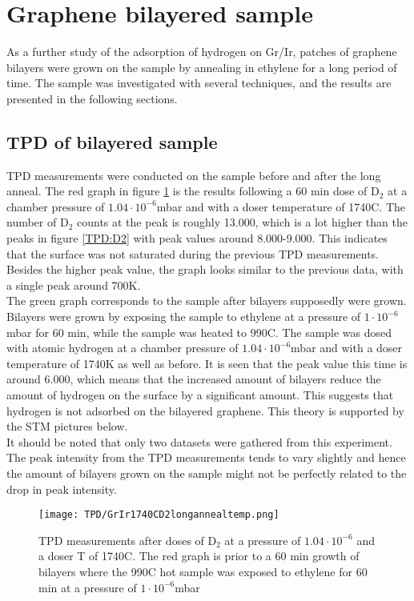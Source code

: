 \section{Graphene bilayered sample}

As a further study of the adsorption of hydrogen on Gr/Ir, patches of graphene bilayers were grown on the sample by annealing in ethylene for a long period of time. The sample was investigated with several techniques, and the results are presented in the following sections.

\subsection{TPD of bilayered sample}
TPD measurements were conducted on the sample before and after the long anneal. The red graph in figure \ref{TPD:bilayer} is the results following a 60 min dose of D$_2$ at a chamber pressure of $1.04\cdot10^{-6}$mbar and with a doser temperature of 1740\degree C. The number of D$_2$ counts at the peak is roughly 13.000, which is a lot higher than the peaks in figure \ref{TPD:D2} with peak values around 8.000-9.000. This indicates that the surface was not saturated during the previous TPD measurements. Besides the higher peak value, the graph looks similar to the previous data, with a single peak around 700K.\\
The green graph corresponds to the sample after bilayers supposedly were grown. Bilayers were grown by exposing the sample to ethylene at a pressure of $1\cdot 10^{-6}$mbar for 60 min, while the sample was heated to 990\degree C. The sample was dosed with atomic hydrogen at a chamber pressure of $1.04\cdot 10^{-6}$mbar and with a doser temperature of 1740K as well as before. It is seen that the peak value this time is around 6.000, which means that the increased amount of bilayers reduce the amount of hydrogen on the surface by a significant amount. This suggests that hydrogen is not adsorbed on the bilayered graphene. This theory is supported by the STM pictures below.\\
It should be noted that only two datasets were gathered from this experiment. The peak intensity from the TPD measurements tends to vary slightly and hence the amount of bilayers grown on the sample might not be perfectly related to the drop in peak intensity.
\begin{figure}[H]
  \centering
  \texttt{[image: TPD/GrIr1740CD2longannealtemp.png]}
  \caption{TPD measurements after doses of D$_2$ at a pressure of $1.04\cdot10^{-6}$ and a doser T of 1740\degree C. The red graph is prior to a 60 min growth of bilayers where the 990\degree C hot sample was exposed to ethylene for 60 min at a pressure of $1\cdot10^{-6}$mbar}
  \label{TPD:bilayer}
\end{figure}


